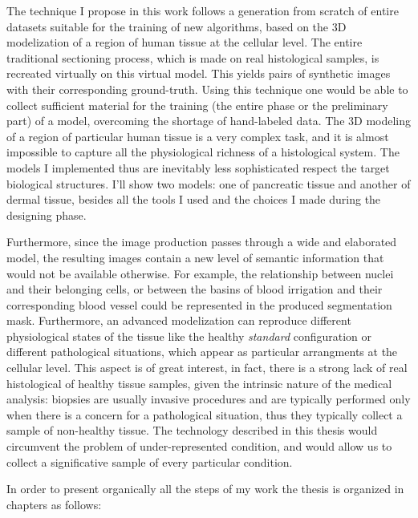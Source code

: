 The technique I propose in this work follows a generation from scratch of entire datasets suitable for the training of new algorithms, based on the 3D modelization of a region of human tissue at the cellular level. The entire traditional sectioning process, which is made on real histological samples, is recreated virtually on this virtual model. This yields pairs of synthetic images with their corresponding ground-truth. Using this technique one would be able to collect sufficient material for the training (the entire phase or the preliminary part) of a model, overcoming the shortage of hand-labeled data. The 3D modeling of a region of particular human tissue is a very complex task, and it is almost impossible to capture all the physiological richness of a histological system. The models I implemented thus are inevitably less sophisticated respect the target biological structures. I'll show two models: one of pancreatic tissue and another of dermal tissue, besides all the tools I used and the choices I made during the designing phase.

Furthermore, since the image production passes through a wide and elaborated model, the resulting images contain a new level of semantic information that would not be available otherwise. For example, the relationship between nuclei and their belonging cells, or between the basins of blood irrigation and their corresponding blood vessel could be represented in the produced segmentation mask. Furthermore, an advanced modelization can reproduce different physiological states of the tissue like the healthy \textit{standard} configuration or different pathological situations, which appear as particular arrangments at the cellular level. This aspect is of great interest, in fact, there is a strong lack of real histological of healthy tissue samples, given the intrinsic nature of the medical analysis: biopsies are usually invasive procedures and are typically performed only when there is a concern for a pathological situation, thus they typically collect a sample of non-healthy tissue. The technology described in this thesis would circumvent the problem of under-represented condition, and would allow us to collect a significative sample of every particular condition.

In order to present organically all the steps of my work the thesis is organized in chapters as follows:


